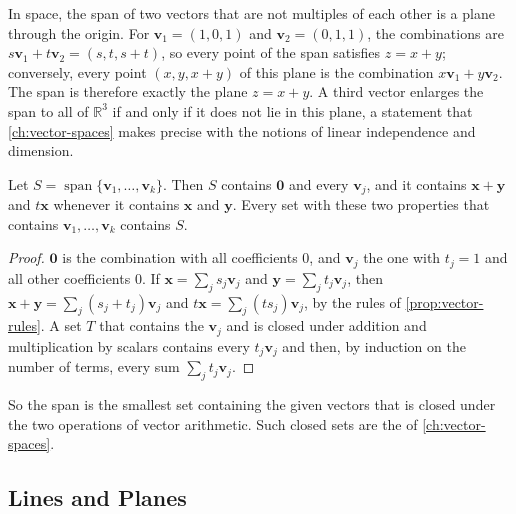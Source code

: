 In space, the span of two vectors that are not multiples of each other is a plane through the origin. For $\mathbf v_1=(1,0,1)$ and $\mathbf v_2=(0,1,1)$, the combinations are $s\mathbf v_1+t\mathbf v_2=(s,t,s+t)$, so every point of the span satisfies $z=x+y$; conversely, every point $(x,y,x+y)$ of this plane is the combination $x\mathbf v_1+y\mathbf v_2$. The span is therefore exactly the plane $z=x+y$. A third vector enlarges the span to all of $\mathbb R^3$ if and only if it does not lie in this plane, a statement that \cref{ch:vector-spaces} makes precise with the notions of linear independence and dimension.

\begin{proposition}[Spans]
\label{prop:span}
Let $S=\operatorname{span}\{\mathbf v_1,\ldots,\mathbf v_k\}$. Then $S$ contains $\mathbf 0$ and every $\mathbf v_j$, and it contains $\mathbf x+\mathbf y$ and $t\mathbf x$ whenever it contains $\mathbf x$ and $\mathbf y$. Every set with these two properties that contains $\mathbf v_1,\ldots,\mathbf v_k$ contains $S$.
\end{proposition}

\begin{proof}
$\mathbf 0$ is the combination with all coefficients $0$, and $\mathbf v_j$ the one with $t_j=1$ and all other coefficients $0$. If $\mathbf x=\sum_js_j\mathbf v_j$ and $\mathbf y=\sum_jt_j\mathbf v_j$, then $\mathbf x+\mathbf y=\sum_j(s_j+t_j)\mathbf v_j$ and $t\mathbf x=\sum_j(ts_j)\mathbf v_j$, by the rules of \cref{prop:vector-rules}. A set $T$ that contains the $\mathbf v_j$ and is closed under addition and multiplication by scalars contains every $t_j\mathbf v_j$ and then, by induction on the number of terms, every sum $\sum_jt_j\mathbf v_j$.
\end{proof}

So the span is the smallest set containing the given vectors that is closed under the two operations of vector arithmetic. Such closed sets are the  of \cref{ch:vector-spaces}.

\subsection{Lines and Planes}

